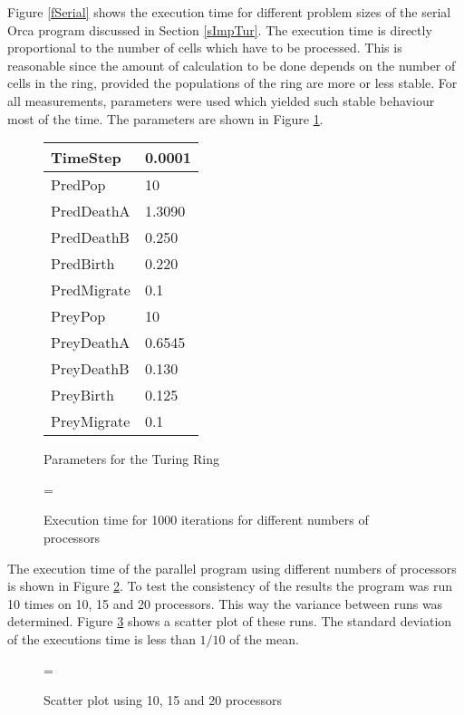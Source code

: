Figure \ref{fSerial} shows the execution time for different problem
sizes of the serial Orca program discussed in Section
\ref{sImpTur}. 
The execution time is directly proportional to the number of
cells which have to be processed. This is reasonable since the amount
of calculation to be done depends on the number of cells in the ring,
provided the populations of the ring are more or less stable. For all
measurements, parameters were used which yielded such stable behaviour
most of the time. The parameters are shown in Figure \ref{fParamsUsed}.


\begin{figure}[p]
\begin{center}
\begin{tabular}{|l|l|}
	\hline
	TimeStep & 0.0001 \\
	\hline
	PredPop & 10 \\
	\hline
	PredDeathA & 1.3090 \\
	\hline
	PredDeathB & 0.250 \\
	\hline
	PredBirth & 0.220 \\
	\hline
	PredMigrate & 0.1 \\
	\hline
	PreyPop & 10 \\
	\hline
	PreyDeathA & 0.6545 \\
	\hline
	PreyDeathB & 0.130 \\
	\hline
	PreyBirth & 0.125 \\
	\hline
	PreyMigrate & 0.1 \\
	\hline
\end{tabular}
\end{center}
\caption{Parameters for the Turing Ring}
\label{fParamsUsed}
\end{figure}

\begin{figure}[p]
\epsfxsize=\textwidth
{}
\caption{Execution time for 1000 iterations for different numbers of
processors}
\label{fExTime}
\end{figure}

The execution time of the parallel program using different numbers of
processors is shown in Figure \ref{fExTime}.
To test the consistency of the results the program was run 10
times on 10, 15 and 20 processors. This way the variance between runs
was determined. Figure \ref{fScatter} shows a scatter plot of these
runs. The standard deviation of the executions time is less than
$1/10$ of the mean.

\begin{figure}[p]
\epsfxsize = \textwidth
{}
\caption{Scatter plot using 10, 15 and 20 processors}
\label{fScatter}
\end{figure}

